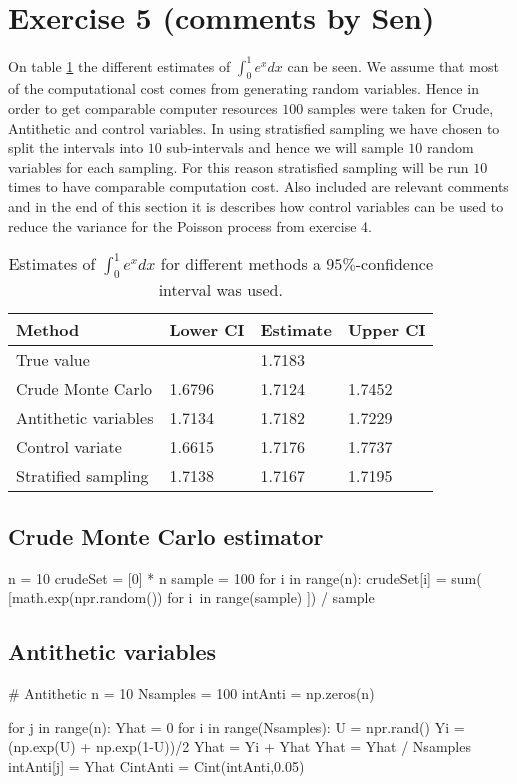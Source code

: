 \newpage
\section*{Exercise 5 (comments by Sen)}

On table \ref{tab:week5} the different estimates of $\int_0^1e^{x}dx$ can be seen. We assume that most of the computational cost comes from generating random variables. Hence in order to get comparable computer resources $100$ samples were taken for Crude, Antithetic and control variables. In using stratisfied sampling we have chosen to split the intervals into $10$ sub-intervals and hence we will sample $10$ random variables for each sampling. For this reason stratisfied sampling will be run $10$ times to have comparable computation cost. Also included are relevant comments and in the end of this section it is describes how control variables can be used to reduce the variance for the Poisson process from exercise 4. 

\begin{table}[H]
\centering
\begin{tabular}{|l|l|l|l|}
\hline
 Method & Lower CI & Estimate & Upper CI  \\ \hline
 True value & & 1.7183 & \\ \hline
 Crude Monte Carlo&1.6796&1.7124&1.7452\\ \hline
 Antithetic variables & 1.7134 & 1.7182 & 1.7229 \\ \hline
Control variate & 1.6615 & 1.7176 &1.7737\\ \hline
 Stratified sampling & 1.7138 & 1.7167 & 1.7195 \\ \hline

\end{tabular}
\caption{Estimates of $\int_{0}^{1}e^{x}dx$ for different methods a $95\%$-confidence interval was used. }
\label{tab:week5}
\end{table}

\subsection*{Crude Monte Carlo estimator}
\begin{python}
n = 10
crudeSet = [0] * n
sample = 100
for i in range(n):
    crudeSet[i] = sum( [math.exp(npr.random()) for i\
                        in range(sample) ]) / sample 
\end{python}

\subsection*{Antithetic variables}
\begin{python}
# Antithetic
n = 10
Nsamples = 100
intAnti = np.zeros(n)

for j in range(n):
    Yhat = 0
    for i in range(Nsamples):
        U = npr.rand()
        Yi = (np.exp(U) + np.exp(1-U))/2
        Yhat = Yi + Yhat
    Yhat = Yhat / Nsamples
    intAnti[j] = Yhat
CintAnti = Cint(intAnti,0.05)
\end{python}



